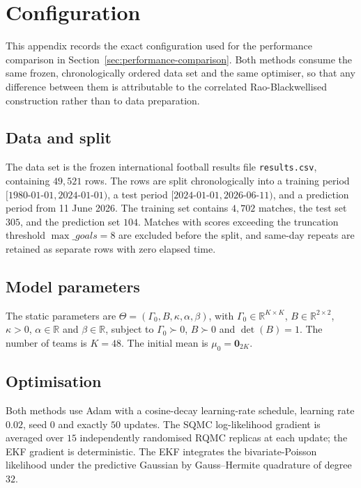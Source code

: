 \chapter{Configuration}
\label{app:config}

This appendix records the exact configuration used for the performance comparison in Section~\ref{sec:performance-comparison}. Both methods consume the same frozen, chronologically ordered data set and the same optimiser, so that any difference between them is attributable to the correlated Rao-Blackwellised construction rather than to data preparation.

\section{Data and split}

The data set is the frozen international football results file \texttt{results.csv}, containing $49{,}521$ rows. The rows are split chronologically into a training period $[1980\text{-}01\text{-}01, 2024\text{-}01\text{-}01)$, a test period $[2024\text{-}01\text{-}01, 2026\text{-}06\text{-}11)$, and a prediction period from 11 June 2026. The training set contains $4{,}702$ matches, the test set $305$, and the prediction set $104$. Matches with scores exceeding the truncation threshold $\max\_goals = 8$ are excluded before the split, and same-day repeats are retained as separate rows with zero elapsed time.

\section{Model parameters}

The static parameters are $\Theta = (\Gamma_0, B, \kappa, \alpha, \beta)$, with $\Gamma_0 \in \mathbb{R}^{K \times K}$, $B \in \mathbb{R}^{2 \times 2}$, $\kappa > 0$, $\alpha \in \mathbb{R}$ and $\beta \in \mathbb{R}$, subject to $\Gamma_0 \succ 0$, $B \succ 0$ and $\det(B) = 1$. The number of teams is $K = 48$. The initial mean is $\mu_0 = \mathbf{0}_{2K}$.

\section{Optimisation}

Both methods use Adam with a cosine-decay learning-rate schedule, learning rate $0.02$, seed $0$ and exactly $50$ updates. The SQMC log-likelihood gradient is averaged over $15$ independently randomised RQMC replicas at each update; the EKF gradient is deterministic. The EKF integrates the bivariate-Poisson likelihood under the predictive Gaussian by Gauss--Hermite quadrature of degree $32$.


